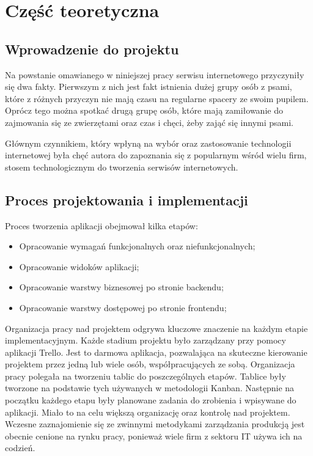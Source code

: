 \chapter{Część teoretyczna}
\section{Wprowadzenie do projektu}
Na powstanie omawianego w niniejszej pracy serwisu internetowego przyczyniły się dwa fakty. Pierwszym z nich jest fakt istnienia dużej grupy osób z psami, które z różnych przyczyn nie mają czasu na regularne spacery ze swoim pupilem. Oprócz tego można spotkać drugą grupę osób, które mają zamiłowanie do zajmowania się ze zwierzętami oraz czas i chęci, żeby zająć się innymi psami. 

Głównym czynnikiem, który wpłyną na wybór oraz zastosowanie technologii internetowej była chęć autora do zapoznania się z popularnym wśród wielu firm, stosem technologicznym do tworzenia serwisów internetowych.
\section{Proces projektowania i implementacji}
Proces tworzenia aplikacji obejmował kilka etapów:
\begin{itemize}[leftmargin=1cm]
    \item Opracowanie wymagań funkcjonalnych oraz niefunkcjonalnych;
    \item Opracowanie widoków aplikacji;
    \item Opracowanie warstwy biznesowej po stronie backendu;
    \item Opracowanie warstwy dostępowej po stronie frontendu;
\end{itemize}

Organizacja pracy nad projektem odgrywa kluczowe znaczenie na każdym etapie implementacyjnym. Każde stadium projektu było zarządzany przy pomocy aplikacji Trello. Jest to darmowa aplikacja, pozwalająca na skuteczne kierowanie projektem przez jedną lub wiele osób, współpracujących ze sobą. Organizacja pracy polegała na tworzeniu tablic do poszczególnych etapów. Tablice były tworzone na podstawie tych używanych w metodologii Kanban. Następnie na początku każdego etapu były planowane zadania do zrobienia i wpisywane do aplikacji. Miało to na celu większą organizację oraz kontrolę nad projektem. Wczesne zaznajomienie się ze zwinnymi metodykami zarządzania produkcją jest obecnie cenione na rynku pracy, ponieważ wiele firm z sektoru IT używa ich na codzień.
